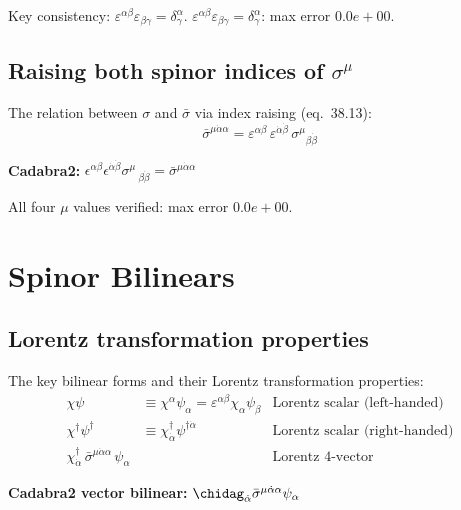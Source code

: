 \documentclass[12pt]{article}
\newcommand{\verified}[1]{\textcolor{verifygreen}{\checkmark\; #1}}
\newcommand{\dal}{\dot{\alpha}}
\newcommand{\dbe}{\dot{\beta}}
\newcommand{\sigmabar}{\bar{\sigma}}
\begin{document}
Key consistency: $\varepsilon^{\alpha\beta}\varepsilon_{\beta\gamma} = \delta^\alpha_\gamma$.
\verified{$\varepsilon^{\alpha\beta}\varepsilon_{\beta\gamma}=\delta^\alpha_\gamma$: max error $0.0e+00$.}

\subsection{Raising both spinor indices of \texorpdfstring{$\sigma^\mu$}{sigma}}

The relation between $\sigma$ and $\bar\sigma$ via index raising (eq.~38.13):
\begin{equation}
  \bar\sigma^{\mu\dot\alpha\alpha}
  = \varepsilon^{\alpha\beta}\,\varepsilon^{\dot\alpha\dot\beta}\,
    \sigma^\mu{}_{\beta\dot\beta}
  \tag{38.13}
\end{equation}

\textbf{Cadabra2:} $\epsilon^{\alpha \beta} \epsilon^{\dal \dbe} \sigma^{\mu}\,_{\beta \dbe} = \sigmabar^{\mu \dal \alpha}$

\verified{All four $\mu$ values verified: max error $0.0e+00$.}

\section{Spinor Bilinears}

\subsection{Lorentz transformation properties}

The key bilinear forms and their Lorentz transformation properties:
\begin{align}
  \chi\psi &\equiv \chi^\alpha\psi_\alpha
  = \varepsilon^{\alpha\beta}\chi_\alpha\psi_\beta
  &\text{Lorentz scalar (left-handed)}
  \tag{38.14a}\\
  \chi^\dagger\psi^\dagger &\equiv \chi^\dagger_{\dot\alpha}\psi^{\dagger\dot\alpha}
  &\text{Lorentz scalar (right-handed)}
  \tag{38.14b}\\
  \chi^\dagger_{\dot\alpha}\,\bar\sigma^{\mu\dot\alpha\alpha}\,\psi_\alpha
  &
  &\text{Lorentz 4-vector}
  \tag{38.14c}
\end{align}

\textbf{Cadabra2 vector bilinear:} $\chidag_{\dal} \sigmabar^{\mu \dal \alpha} \psi_{\alpha}$
\end{document}
